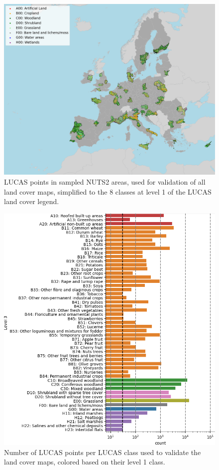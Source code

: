     \begin{figure}[H!]
    \centering
    \includegraphics[width=\textwidth]{figs_05/fig_lucas_aoi.png}
    \caption{LUCAS points in sampled NUTS2 areas, used for validation of all land cover maps, simplified to the 8 classes at level 1 of the LUCAS land cover legend.}
    \label{fig:05_lucas_aoi}
    \end{figure}
    
    \begin{figure}[H!]
    \centering
    \includegraphics[width=\textwidth]{figs_05/fig_lucas_aoi_counts.png}
    \caption{Number of LUCAS points per LUCAS class used to validate the land cover maps, colored based on their level 1 class.}
    \label{fig:05_lucas_aoi_counts}
    \end{figure}

